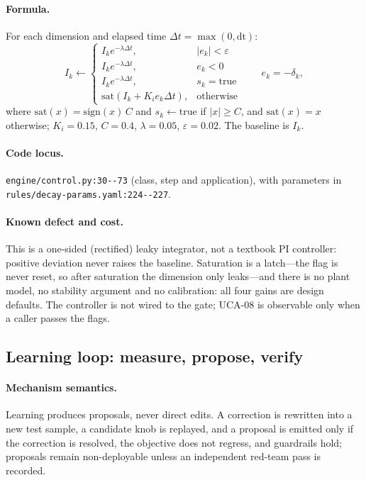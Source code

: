 \paragraph{Formula.} For each dimension and elapsed time $\Delta t = \max(0,
\mathrm{dt})$:
\begin{equation}
I_k \leftarrow
\begin{cases}
I_k e^{-\lambda \Delta t}, & \lvert e_k \rvert < \varepsilon\\
I_k e^{-\lambda \Delta t}, & e_k < 0\\
I_k e^{-\lambda \Delta t}, & s_k = \mathrm{true}\\
\mathrm{sat}(I_k + K_i e_k \Delta t), & \text{otherwise}
\end{cases}
\qquad e_k = -\delta_k,
\end{equation}
where $\mathrm{sat}(x) = \mathrm{sign}(x)\,C$ and $s_k \leftarrow
\mathrm{true}$ if $\lvert x \rvert \ge C$, and $\mathrm{sat}(x)=x$ otherwise;
$K_i=0.15$, $C=0.4$, $\lambda=0.05$, $\varepsilon=0.02$. The baseline is $I_k$.

\paragraph{Code locus.} \texttt{engine/\allowbreak{}control.\allowbreak{}py:\allowbreak{}30-\allowbreak{}-\allowbreak{}73} (class, step and
application), with parameters in \texttt{rules/\allowbreak{}decay-\allowbreak{}params.\allowbreak{}yaml:\allowbreak{}224-\allowbreak{}-\allowbreak{}227}.

\paragraph{Known defect and cost.} This is a one-sided (rectified) leaky
integrator, not a textbook PI controller: positive deviation never raises the
baseline. Saturation is a latch---the flag is never reset, so after saturation
the dimension only leaks---and there is no plant model, no stability argument
and no calibration: all four gains are design defaults. The controller is not
wired to the gate; UCA-08 is observable only when a caller passes the flags.

\subsection{Learning loop: measure, propose, verify}\label{sec:method:learn}

\paragraph{Mechanism semantics.} Learning produces proposals, never direct
edits. A correction is rewritten into a new test sample, a candidate knob is
replayed, and a proposal is emitted only if the correction is resolved, the
objective does not regress, and guardrails hold; proposals remain
non-deployable unless an independent red-team pass is recorded.

